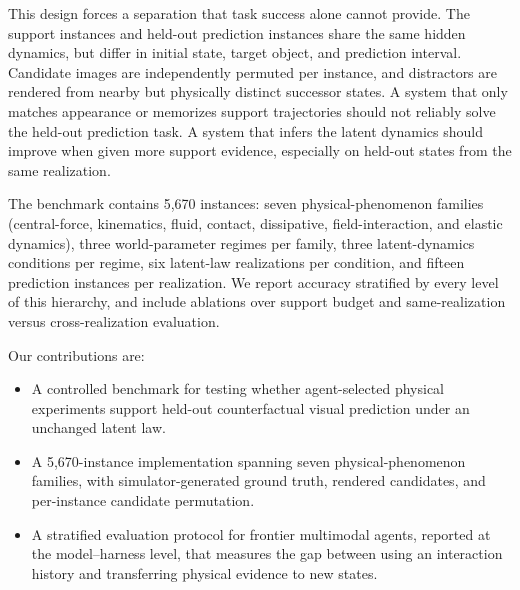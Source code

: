 This design forces a separation that task success alone cannot provide. The support instances and held-out prediction instances share the same hidden dynamics, but differ in initial state, target object, and prediction interval. Candidate images are independently permuted per instance, and distractors are rendered from nearby but physically distinct successor states. A system that only matches appearance or memorizes support trajectories should not reliably solve the held-out prediction task. A system that infers the latent dynamics should improve when given more support evidence, especially on held-out states from the same realization.

The benchmark contains 5,670 instances: seven physical-phenomenon families (central-force, kinematics, fluid, contact, dissipative, field-interaction, and elastic dynamics), three world-parameter regimes per family, three latent-dynamics conditions per regime, six latent-law realizations per condition, and fifteen prediction instances per realization. We report accuracy stratified by every level of this hierarchy, and include ablations over support budget and same-realization versus cross-realization evaluation.

Our contributions are:
\begin{itemize}
  \item A controlled benchmark for testing whether agent-selected physical experiments support held-out counterfactual visual prediction under an unchanged latent law.
  \item A 5,670-instance implementation spanning seven physical-phenomenon families, with simulator-generated ground truth, rendered candidates, and per-instance candidate permutation.
  \item A stratified evaluation protocol for frontier multimodal agents, reported at the model--harness level, that measures the gap between using an interaction history and transferring physical evidence to new states. 
\end{itemize}

